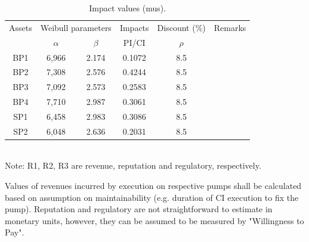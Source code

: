 \begin{table}[h]
	\caption{Impact values (mus).}
	\label{ch05_tbl_impactvalue01}
	{\footnotesize
\begin{tabular}{c|c|c|l|l|l}
	\hline
	Assets & \multicolumn{2}{c|}{Weibull parameters} & \multicolumn{1}{c|}{Impacts} & \multicolumn{1}{c|}{Discount (\%)} & Remarks \\ 
	\cline{2-3}
	& $\alpha$ & $\beta$ & \multicolumn{1}{c|}{PI/CI} & \multicolumn{1}{c|}{$\rho$} &  \\ 
	\hline
	BP1 & 6,966 & 2.174 & \multicolumn{1}{c|}{0.1072} & \multicolumn{1}{c|}{8.5} &  \\ 
	BP2 & 7,308 & 2.576 & \multicolumn{1}{c|}{0.4244} & \multicolumn{1}{c|}{8.5} &  \\ 
	BP3 & 7,092 & 2.573 & \multicolumn{1}{c|}{0.2583} & \multicolumn{1}{c|}{8.5} &  \\ 
	BP4 & 7,710 & 2.987 & \multicolumn{1}{c|}{0.3061} & \multicolumn{1}{c|}{8.5} &  \\ 
	SP1 & 6,458 & 2.983 & \multicolumn{1}{c|}{0.3086} & \multicolumn{1}{c|}{8.5} &  \\ 
	SP2 & 6,048 & 2.636 & \multicolumn{1}{c|}{0.2031} & \multicolumn{1}{c|}{8.5} &  \\ 
	\hline
\end{tabular}
\\
Note: R1, R2, R3 are revenue, reputation and regulatory, respectively.
	}
\end{table}

Values of revenues incurred by execution on respective pumps shall be calculated based on assumption on maintainability (e.g. duration of CI execution to fix the pump). Reputation and regulatory are not straightforward to estimate in monetary units, however, they can be assumed to be measured by "Willingness to Pay".

